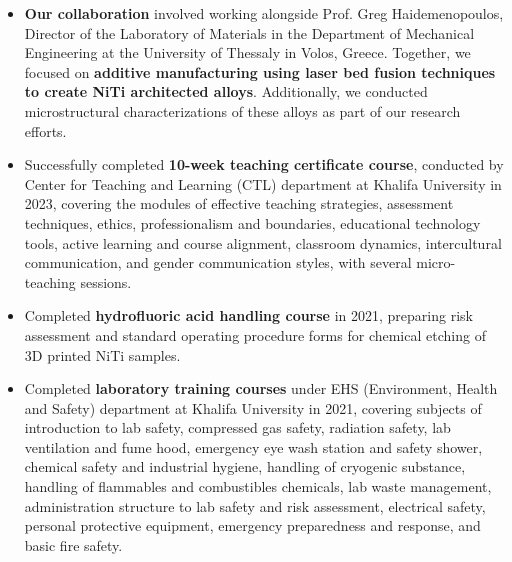 

\begin{cvparagraph}
\begin{itemize}

    \item \textcolor{russell}{\textbf{Our collaboration} involved working alongside Prof. Greg Haidemenopoulos, Director of the Laboratory of Materials in the Department of Mechanical Engineering at the University of Thessaly in Volos, Greece. Together, we focused on \textbf{additive manufacturing using laser bed fusion techniques to create NiTi architected alloys}. Additionally, we conducted microstructural characterizations of these alloys as part of our research efforts.}
    \item \textcolor{russell}{Successfully completed \textbf{10-week teaching certificate course}, conducted by Center for Teaching and Learning (CTL) department at Khalifa University in 2023, covering the modules of effective teaching strategies, assessment techniques, ethics, professionalism and boundaries, educational technology tools, active learning and course alignment, classroom dynamics, intercultural communication, and gender communication styles, with several micro-teaching sessions.}
    \item \textcolor{russell}{Completed \textbf{hydrofluoric acid handling course} in 2021, preparing risk assessment and standard operating procedure forms for chemical etching of 3D printed NiTi samples.}
    \item \textcolor{russell}{Completed \textbf{laboratory training courses} under EHS (Environment, Health and Safety) department at Khalifa University in 2021, covering subjects of introduction to lab safety, compressed gas safety, radiation safety, lab ventilation and fume hood, emergency eye wash station and safety shower, chemical safety and industrial hygiene, handling of cryogenic substance, handling of flammables and combustibles chemicals, lab waste management, administration structure to lab safety and risk assessment, electrical safety, personal protective equipment, emergency preparedness and response, and basic fire safety.}

\end{itemize}
\end{cvparagraph}
